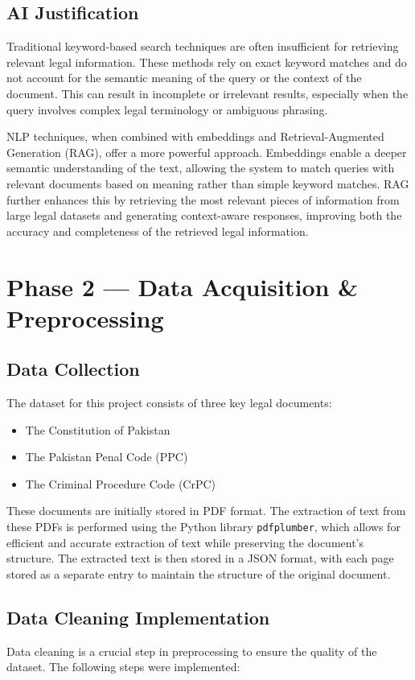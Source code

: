 \documentclass{article}
\begin{document}
\subsection{AI Justification}
Traditional keyword-based search techniques are often insufficient for retrieving relevant legal information. These methods rely on exact keyword matches and do not account for the semantic meaning of the query or the context of the document. This can result in incomplete or irrelevant results, especially when the query involves complex legal terminology or ambiguous phrasing.

NLP techniques, when combined with embeddings and Retrieval-Augmented Generation (RAG), offer a more powerful approach. Embeddings enable a deeper semantic understanding of the text, allowing the system to match queries with relevant documents based on meaning rather than simple keyword matches. RAG further enhances this by retrieving the most relevant pieces of information from large legal datasets and generating context-aware responses, improving both the accuracy and completeness of the retrieved legal information.


\section{Phase 2 — Data Acquisition \& Preprocessing}

\subsection{Data Collection}
The dataset for this project consists of three key legal documents:
\begin{itemize}
    \item The Constitution of Pakistan
    \item The Pakistan Penal Code (PPC)
    \item The Criminal Procedure Code (CrPC)
\end{itemize}

These documents are initially stored in PDF format. The extraction of text from these PDFs is performed using the Python library \texttt{pdfplumber}, which allows for efficient and accurate extraction of text while preserving the document's structure. The extracted text is then stored in a JSON format, with each page stored as a separate entry to maintain the structure of the original document.

\subsection{Data Cleaning Implementation}
Data cleaning is a crucial step in preprocessing to ensure the quality of the dataset. The following steps were implemented:
\end{document}
